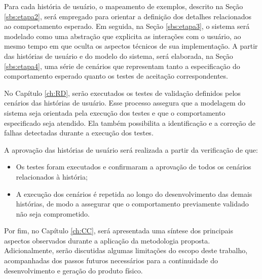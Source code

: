Para cada história de usuário, o mapeamento de exemplos, descrito na Seção \ref{sbs:etapa2}, será empregado para orientar a definição dos detalhes relacionados 
ao comportamento esperado. Em seguida, na Seção \ref{sbs:etapa3}, o sistema será modelado como uma abstração que explicita as interações com o usuário, ao mesmo 
tempo em que oculta os aspectos técnicos de sua implementação. A partir das histórias de usuário e do modelo do sistema, será elaborada, na Seção \ref{sbs:etapa4}, 
uma série de cenários que representam tanto a especificação do comportamento esperado quanto os testes de aceitação correspondentes.  

No Capítulo \ref{ch:RD}, serão executados os testes de validação definidos pelos cenários das histórias de usuário. Esse processo assegura que a modelagem do sistema 
seja orientada pela execução dos testes e que o comportamento especificado seja atendido. Ela também possibilita a identificação e a correção de falhas detectadas 
durante a execução dos testes.

A aprovação das histórias de usuário será realizada a partir da verificação de que:

\begin{itemize}
    \item Os testes foram executados e confirmaram a aprovação de todos os cenários relacionados à história;
    \item A execução dos cenários é repetida ao longo do desenvolvimento das demais histórias, de modo a assegurar que o comportamento previamente validado não seja comprometido.
\end{itemize}

Por fim, no Capítulo \ref{ch:CC}, será apresentada uma síntese dos principais aspectos observados durante a aplicação da metodologia proposta. Adicionalmente, serão 
discutidas algumas limitações do escopo deste trabalho, acompanhadas dos passos futuros necessários para a continuidade do desenvolvimento e geração 
do produto físico.
